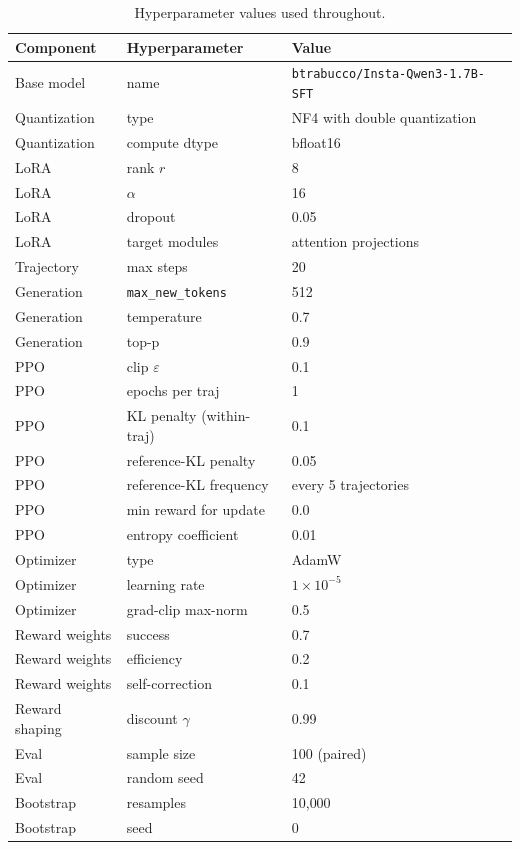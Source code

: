 \documentclass[12pt,a4paper]{report}
\begin{document}
\begin{table}[h]
\centering
\small
\begin{tabular}{lll}
\toprule
\textbf{Component} & \textbf{Hyperparameter} & \textbf{Value} \\
\midrule
Base model & name & \texttt{btrabucco/Insta-Qwen3-1.7B-SFT} \\
Quantization & type & NF4 with double quantization \\
Quantization & compute dtype & bfloat16 \\
LoRA & rank $r$ & 8 \\
LoRA & $\alpha$ & 16 \\
LoRA & dropout & 0.05 \\
LoRA & target modules & attention projections \\
\midrule
Trajectory & max steps & 20 \\
Generation & \texttt{max\_new\_tokens} & 512 \\
Generation & temperature & 0.7 \\
Generation & top-p & 0.9 \\
\midrule
PPO & clip $\varepsilon$ & 0.1 \\
PPO & epochs per traj & 1 \\
PPO & KL penalty (within-traj) & 0.1 \\
PPO & reference-KL penalty & 0.05 \\
PPO & reference-KL frequency & every 5 trajectories \\
PPO & min reward for update & 0.0 \\
PPO & entropy coefficient & 0.01 \\
\midrule
Optimizer & type & AdamW \\
Optimizer & learning rate & $1 \times 10^{-5}$ \\
Optimizer & grad-clip max-norm & 0.5 \\
\midrule
Reward weights & success & 0.7 \\
Reward weights & efficiency & 0.2 \\
Reward weights & self-correction & 0.1 \\
Reward shaping & discount $\gamma$ & 0.99 \\
\midrule
Eval & sample size & 100 (paired) \\
Eval & random seed & 42 \\
Bootstrap & resamples & 10{,}000 \\
Bootstrap & seed & 0 \\
\bottomrule
\end{tabular}
\caption{Hyperparameter values used throughout.}
\label{tab:hparams}
\end{table}
\end{document}
